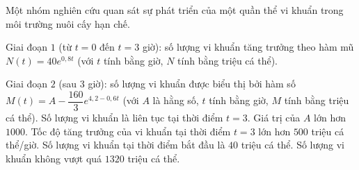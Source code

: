 \begin{ex}
Một nhóm nghiên cứu quan sát sự phát triển của một quần thể vi khuẩn trong môi trường nuôi cấy hạn chế.

Giai đoạn $1$ (từ $t=0$ đến $t=3$ giờ): số lượng vi khuẩn tăng trưởng theo hàm mũ $N(t)=40e^{0{,}8t}$ (với $t$ tính bằng giờ, $N$ tính bằng triệu cá thể).

Giai đoạn $2$ (sau $3$ giờ): số lượng vi khuẩn được biểu thị bởi hàm số $M(t)=A-\dfrac{160}{3}e^{4{,}2-0{,}6t}$ (với $A$ là hằng số, $t$ tính bằng giờ, $M$ tính bằng triệu cá thể). Số lượng vi khuẩn là liên tục tại thời điểm $t=3$.
\choiceTF
{\True Giá trị của $A$ lớn hơn $1000$.}
{Tốc độ tăng trưởng của vi khuẩn tại thời điểm $t=3$ lớn hơn $500$ triệu cá thể/giờ.}
{\True Số lượng vi khuẩn tại thời điểm bắt đầu là $40$ triệu cá thể.}
{\True Số lượng vi khuẩn không vượt quá $1320$ triệu cá thể.}
\end{ex}
